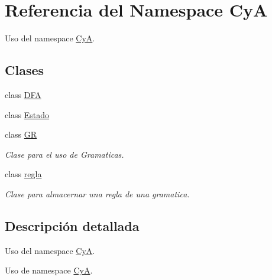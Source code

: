 \hypertarget{namespace_cy_a}{}\section{Referencia del Namespace CyA}
\label{namespace_cy_a}


Uso del namespace \mbox{\hyperlink{namespace_cy_a}{CyA}}.  


\subsection*{Clases}
\begin{DoxyCompactItemize}
\item 
class \mbox{\hyperlink{class_cy_a_1_1_d_f_a}{D\+FA}}
\item 
class \mbox{\hyperlink{class_cy_a_1_1_estado}{Estado}}
\item 
class \mbox{\hyperlink{class_cy_a_1_1_g_r}{GR}}
\begin{DoxyCompactList}\small\item\em Clase para el uso de Gramaticas. \end{DoxyCompactList}\item 
class \mbox{\hyperlink{class_cy_a_1_1regla}{regla}}
\begin{DoxyCompactList}\small\item\em Clase para almacernar una regla de una gramatica. \end{DoxyCompactList}\end{DoxyCompactItemize}


\subsection{Descripción detallada}
Uso del namespace \mbox{\hyperlink{namespace_cy_a}{CyA}}. 

Uso de namespace \mbox{\hyperlink{namespace_cy_a}{CyA}}. 